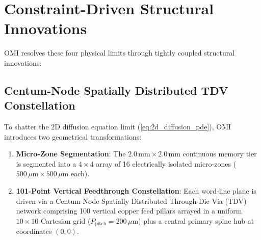 \documentclass[journal]{IEEEtran}
\begin{document}
\section{Constraint-Driven Structural Innovations}
\label{sec:innovations}

OMI resolves these four physical limits through tightly coupled structural innovations:

\subsection{Centum-Node Spatially Distributed TDV Constellation}
To shatter the 2D diffusion equation limit (\ref{eq:2d_diffusion_pde}), OMI introduces two geometrical transformations:
\begin{enumerate}
    \item \textbf{Micro-Zone Segmentation}: The $2.0\,\text{mm} \times 2.0\,\text{mm}$ continuous memory tier is segmented into a $4 \times 4$ array of 16 electrically isolated micro-zones ($500\,\mu\text{m} \times 500\,\mu\text{m}$ each).
    \item \textbf{101-Point Vertical Feedthrough Constellation}: Each word-line plane is driven via a Centum-Node Spatially Distributed Through-Die Via (TDV) network comprising 100 vertical copper feed pillars arrayed in a uniform $10 \times 10$ Cartesian grid ($P_{\text{pitch}} = 200\,\mu\text{m}$) plus a central primary spine hub at coordinates $(0, 0)$.
\end{enumerate}
\end{document}
